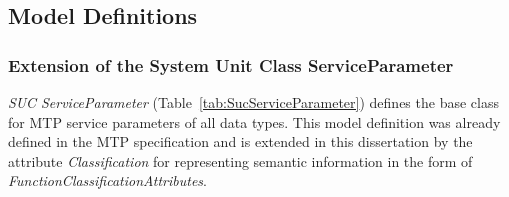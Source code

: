 \subsection{Model Definitions}
\label{subsec:AnhangServiceSetModelle}

\subsubsection{Extension of the System Unit Class ServiceParameter}

\emph{SUC ServiceParameter} (Table~\ref{tab:SucServiceParameter}) defines the base class for MTP service parameters of all data types. This model definition was already defined in the MTP specification and is extended in this dissertation by the attribute \emph{Classification} for representing semantic information in the form of \emph{FunctionClassificationAttributes}.

